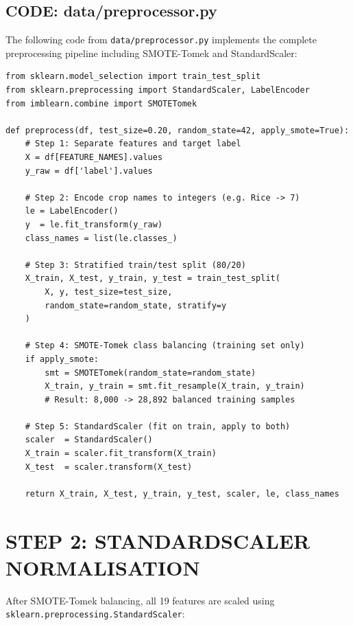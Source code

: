 \documentclass[12pt,a4paper,oneside]{report}
\begin{document}
\subsection{CODE: data/preprocessor.py}

The following code from \texttt{data/preprocessor.py} implements the complete preprocessing pipeline including SMOTE-Tomek and StandardScaler:

\begin{singlespacing}
\begin{lstlisting}[caption={data/preprocessor.py --- Full Preprocessing Pipeline}]
from sklearn.model_selection import train_test_split
from sklearn.preprocessing import StandardScaler, LabelEncoder
from imblearn.combine import SMOTETomek

def preprocess(df, test_size=0.20, random_state=42, apply_smote=True):
    # Step 1: Separate features and target label
    X = df[FEATURE_NAMES].values
    y_raw = df['label'].values

    # Step 2: Encode crop names to integers (e.g. Rice -> 7)
    le = LabelEncoder()
    y  = le.fit_transform(y_raw)
    class_names = list(le.classes_)

    # Step 3: Stratified train/test split (80/20)
    X_train, X_test, y_train, y_test = train_test_split(
        X, y, test_size=test_size,
        random_state=random_state, stratify=y
    )

    # Step 4: SMOTE-Tomek class balancing (training set only)
    if apply_smote:
        smt = SMOTETomek(random_state=random_state)
        X_train, y_train = smt.fit_resample(X_train, y_train)
        # Result: 8,000 -> 28,892 balanced training samples

    # Step 5: StandardScaler (fit on train, apply to both)
    scaler  = StandardScaler()
    X_train = scaler.fit_transform(X_train)
    X_test  = scaler.transform(X_test)

    return X_train, X_test, y_train, y_test, scaler, le, class_names
\end{lstlisting}
\end{singlespacing}

\section{STEP 2: STANDARDSCALER NORMALISATION}

After SMOTE-Tomek balancing, all 19 features are scaled using \texttt{sklearn\allowbreak.preprocessing\allowbreak.StandardScaler}:
\end{document}
